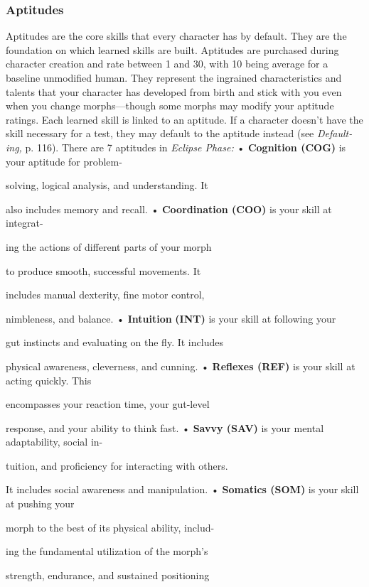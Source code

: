 \subsubsection{Aptitudes}

Aptitudes are the core skills that every character has 
by default. They are the foundation on which learned 
skills are built. Aptitudes are purchased during character
creation and rate between 1 and 30, with 10 being
average for a baseline unmodified human. They represent
the ingrained characteristics and talents that your
character has developed from birth and stick with you 
even when you change morphs—though some morphs 
may modify your aptitude ratings.
Each learned skill is linked to an aptitude. If a 
character doesn't have the skill necessary for a test, 
they may default to the aptitude instead (see \textit{Default-}
\textit{ing,} p. 116).
There are 7 aptitudes in \textit{Eclipse Phase:}
•  \textbf{Cognition (COG)} is your aptitude for problem-

solving, logical analysis, and understanding. It 

also includes memory and recall.
•  \textbf{Coordination (COO)} is your skill at integrat-

ing the actions of different parts of your morph 

to produce smooth, successful movements. It 

includes manual dexterity, fine motor control, 

nimbleness, and balance.
•  \textbf{Intuition} \textbf{(INT)} is your skill at following your 

gut instincts and evaluating on the fly. It includes 

physical awareness, cleverness, and cunning.
•  \textbf{Reflexes (REF)} is your skill at acting quickly. This 

encompasses your reaction time, your gut-level 

response, and your ability to think fast.
•  \textbf{Savvy (SAV)} is your mental adaptability, social in-

tuition, and proficiency for interacting with others. 

It includes social awareness and manipulation.
•  \textbf{Somatics (SOM)} is your skill at pushing your 

morph to the best of its physical ability, includ-

ing the fundamental utilization of the morph's 

strength, endurance, and sustained positioning 

